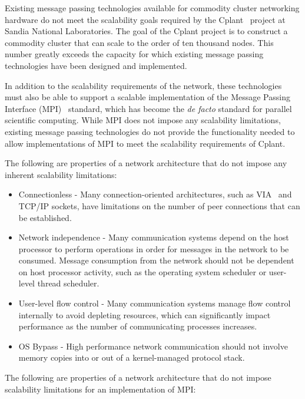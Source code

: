 \documentclass{sand-report}
\begin{document}
Existing message passing technologies available for commodity cluster
networking hardware do not meet the scalability goals required by the
Cplant~\cite{Cplant} project at Sandia National Laboratories.  The goal
of the Cplant project is to construct a commodity cluster that can
scale to the order of ten thousand nodes.  This number greatly exceeds
the capacity for which existing message passing technologies have been
designed and implemented.

In addition to the scalability requirements of the network, these
technologies must also be able to support a scalable implementation of
the Message Passing Interface (MPI)~\cite{MPIstandard} standard, which
has become the {\it de facto} standard for parallel scientific
computing.  While MPI does not impose any scalability limitations,
existing message passing technologies do not provide the functionality
needed to allow implementations of MPI to meet the scalability
requirements of Cplant.

The following are properties of a network architecture that do not
impose any inherent scalability limitations:
\begin{itemize}
\item Connectionless - Many connection-oriented architectures, such as
      VIA~\cite{VIA} and TCP/IP sockets, have limitations on the number
      of peer connections that can be established.
\item Network independence - Many communication systems depend on the
      host processor to perform operations in order for messages in
      the network to be consumed.  Message consumption from the
      network should not be dependent on host processor activity, such
      as the operating system scheduler or user-level thread
      scheduler.
\item User-level flow control - Many communication systems manage flow
      control internally to avoid depleting resources, which can
      significantly impact performance as the number of communicating
      processes increases.
\item OS Bypass - High performance network communication should not
      involve memory copies into or out of a kernel-managed protocol
      stack.
\end{itemize}

The following are properties of a network architecture that do not
impose scalability limitations for an implementation of MPI:
\end{document}
